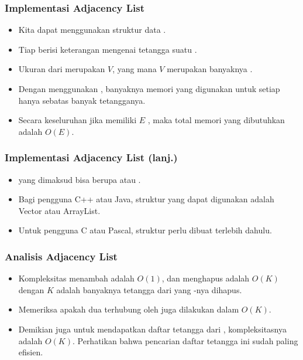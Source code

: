 \begin{frame}
\frametitle{Implementasi Adjacency List}
\begin{itemize}
  \item Kita dapat menggunakan struktur data .
  \item Tiap \flist berisi keterangan mengenai tetangga suatu \fnode.
  \item Ukuran dari \farray merupakan $V$, yang mana $V$ merupakan banyaknya \fnode.
  \item Dengan menggunakan \flist, banyaknya memori yang digunakan untuk setiap \fnode hanya sebatas banyak tetangganya.
  \item Secara keseluruhan jika \fgraph memiliki $E$ \fedge, maka total memori yang dibutuhkan adalah $O(E)$.
\end{itemize}
\end{frame}

\begin{frame}
\frametitle{Implementasi Adjacency List (lanj.)}
\begin{itemize}
  \item \fList yang dimaksud bisa berupa  atau .
  \item Bagi pengguna C++ atau Java, struktur \flist yang dapat digunakan adalah Vector atau ArrayList.
  \item Untuk pengguna C atau Pascal, struktur  perlu dibuat terlebih dahulu.
\end{itemize}
\end{frame}

\begin{frame}
\frametitle{Analisis Adjacency List}
\begin{itemize}
  \item Kompleksitas menambah \fedge adalah $O(1)$, dan menghapus adalah $O(K)$ dengan $K$ adalah banyaknya tetangga dari \fnode yang \fedge-nya dihapus.
  \item Memeriksa apakah dua \fnode terhubung oleh \fedge juga dilakukan dalam $O(K)$.
  \item Demikian juga untuk mendapatkan daftar tetangga dari \fnode, kompleksitasnya adalah $O(K)$. Perhatikan bahwa pencarian daftar tetangga ini sudah paling efisien.
\end{itemize}
\end{frame}

